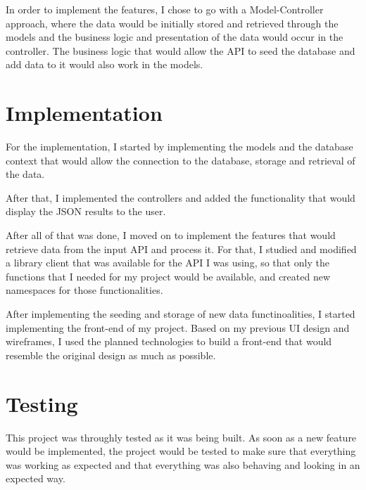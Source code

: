 In order to implement the features, I chose to go with a Model-Controller approach, where the data would be initially stored and retrieved through the models and the business logic and presentation of the data would occur in the controller. The business logic that would allow the API to seed the database and add data to it would also work in the models.

\section{Implementation}
For the implementation, I started by implementing the models and the database context that would allow the connection to the database, storage and retrieval of the data.

After that, I implemented the controllers and added the functionality that would display the JSON results to the user.

After all of that was done, I moved on to implement the features that would retrieve data from the input API and process it. For that, I studied and modified a library client that was available for the API I was using, so that only the functions that I needed for my project would be available, and created new namespaces for those functionalities.

After implementing the seeding and storage of new data functinoalities, I started implementing the front-end of my project. Based on my previous UI design and wireframes, I used the planned technologies to build a front-end that would resemble the original design as much as possible.

\section{Testing}
This project was throughly tested as it was being built. As soon as a new feature would be implemented, the project would be tested to make sure that everything was working as expected and that everything was also behaving and looking in an expected way.